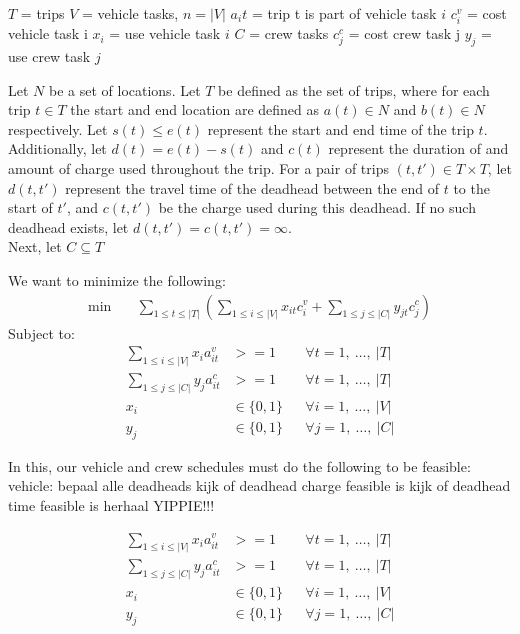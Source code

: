 \documentclass[]{article}
\begin{document}
$T$ = trips
$V$ = vehicle tasks, $n = |V|$
$a_it$ = trip t is part of vehicle task $i$ 
$c^v_i$ = cost vehicle task i
$x_i$ = use vehicle task $i$
$C$ = crew tasks
$c^c_j$ = cost crew task j
$y_j$ = use crew task $j$


Let $N$ be a set of locations. 
Let $T$ be defined as the set of trips, where for each trip $t \in T$ the start and end location are defined as $a(t) \in N$ and $b(t) \in N$ respectively. 
Let $s(t) \leq e(t)$ represent the start and end time of the trip $t$. 
Additionally, let $d(t) = e(t) - s(t)$ and $c(t)$ represent the duration of and amount of charge used throughout the trip. 
For a pair of trips $(t, t') \in T \times T$, let $d(t, t')$ represent the travel time of the deadhead between the end of $t$ to the start of $t'$, and $c(t, t')$ be the charge used during this deadhead. 
If no such deadhead exists, let $d(t, t') = c(t, t') = \infty$. \\
Next, let $C \subseteq T $

We want to minimize the following: 
\setcounter{equation}{0}
\begin{align}
\min \quad
& \sum_{1 \leq t \leq |T|} (\sum_{1 \leq i \leq |V|} x_{it}c^v_i + \sum_{1 \leq j \leq |C|} y_{jt}c^c_j)  
\end{align}
Subject to:
\begin{align}
\sum_{1 \leq i \leq |V|} x_{i}a^v_{it} &>= 1 && \forall t = 1,\:\dots,\:|T| \\
\sum_{1 \leq j \leq |C|} y_{j}a^c_{it} &>= 1 && \forall t = 1,\:\dots,\:|T| \\
x_{i} &\in \{ 0, 1 \} && \forall i = 1,\:\dots,\:|V| \\
y_{j} &\in \{ 0, 1 \} && \forall j = 1,\:\dots,\:|C|
\end{align}

In this, our vehicle and crew schedules must do the following to be feasible: 
vehicle: 
bepaal alle deadheads
kijk of deadhead charge feasible is 
kijk of deadhead time feasible is
herhaal YIPPIE!!!





\begin{align}
\sum_{1 \leq i \leq |V|} x_{i}a^v_{it} &>= 1 && \forall t = 1,\:\dots,\:|T| \\
\sum_{1 \leq j \leq |C|} y_{j}a^c_{it} &>= 1 && \forall t = 1,\:\dots,\:|T| \\
x_{i} &\in \{ 0, 1 \} && \forall i = 1,\:\dots,\:|V| \\
y_{j} &\in \{ 0, 1 \} && \forall j = 1,\:\dots,\:|C|
\end{align}
\end{document}
